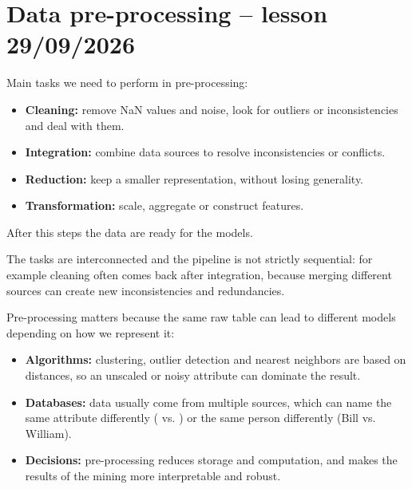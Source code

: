 \section{Data pre-processing -- lesson 29/09/2026}

Main tasks we need to perform in pre-processing:
\begin{itemize}
    \item \textbf{Cleaning:} remove NaN values and noise, look for outliers or inconsistencies and deal with them.
    \item \textbf{Integration:} combine data sources to resolve inconsistencies or conflicts.
    \item \textbf{Reduction:} keep a smaller representation, without losing generality.
    \item \textbf{Transformation:} scale, aggregate or construct features.
\end{itemize}
After this steps the data are ready for the models.

The tasks are interconnected and the pipeline is not strictly sequential: for example cleaning often comes back after integration, because merging different sources can create new inconsistencies and redundancies.

Pre-processing matters because the same raw table can lead to different models depending on how we represent it:
\begin{itemize}
    \item \textbf{Algorithms:} clustering, outlier detection and nearest neighbors are based on distances, so an unscaled or noisy attribute can dominate the result.
    \item \textbf{Databases:} data usually come from multiple sources, which can name the same attribute differently ( vs. ) or the same person differently (Bill vs. William).
    \item \textbf{Decisions:} pre-processing reduces storage and computation, and makes the results of the mining more interpretable and robust.
\end{itemize}

